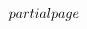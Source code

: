 $${  \hoffset = \dimen0 \advance\hoffset by -1in
  \advance\dimen2 by -\hoffset	%
  \advance\hsize by \dimen2	%
}%
\def\advanceleftmargin{%
  \dimen0 = 0pt \afterassignment\@finishadvanceleftmargin \advance\dimen0
}%
\def\@finishadvanceleftmargin{%
  \advance\hoffset by \dimen0
  \advance\hsize by -\dimen0
}%
\def\rightmargin{\afterassignment\@finishrightmargin \dimen0}%
\def\@finishrightmargin{%
  \@computerightmargin		%
  \advance\dimen2 by -\dimen0	%
  \advance\hsize by \dimen2	%
}%
\def\advancerightmargin{%
  \dimen0 = 0pt \afterassignment\@finishadvancerightmargin \advance\dimen0
}%
\def\@finishadvancerightmargin{%
  \advance\hsize by -\dimen0
}%
\def\@computerightmargin{%
  \dimen2 = \paperwidth		%
  \advance\dimen2 by -\hsize	%
  \advance\dimen2 by -\hoffset	%
  \advance\dimen2 by -1in	%
}%
\newskip\abovedoublecolumnskip \abovedoublecolumnskip = \bigskipamount
\newskip\belowdoublecolumnskip \belowdoublecolumnskip = \bigskipamount
\newdimen\gutter \gutter = 2pc
\newdimen\doublecolumnhsize
\newbox\@partialpage \newdimen\singlecolumnhsize \newdimen\singlecolumnvsize
\newtoks\previousoutput
\def\doublecolumns{%
   \doublecolumnhsize = \hsize   %
   \par   %
   \previousoutput = \expandafter{\the\output}%
   \advance\doublecolumnhsize by -\gutter
   \divide\doublecolumnhsize by 2
   \output = {%
      \global\setbox\@partialpage =
         \vbox{\unvbox255\vskip\abovedoublecolumnskip}%
   }%
   \pagegoal = \pagetotal
   \break %
   \output = {\doublecolumnoutput}%
   \singlecolumnhsize = \hsize
   \singlecolumnvsize = \vsize
   \hsize = \doublecolumnhsize
   \vsize = 2\vsize
}%
\def\@doublecolumnsplit{%
   \splittopskip = \topskip
   \splitmaxdepth = \maxdepth
   \dimen0 = \singlecolumnvsize
      \advance\dimen0 by -\ht\@partialpage
      \advance\dimen0 by -\ht\footins
      \ifvoid\footins\else \advance\dimen0 by -\skip\footins \fi
      \advance\dimen0 by -\ht\topins
      \ifvoid\topins\else \advance\dimen0 by -\skip\topins \fi
   \begingroup
      \vbadness = 10000
      \global\setbox1 = \vsplit255 to \dimen0
      \wd1 = \hsize
      \global\setbox3 = \vsplit255 to \dimen0
      \wd3 = \hsize	
   \endgroup
   \global\setbox4 = \vbox{\unvbox255 \penalty\outputpenalty}%
}$$
